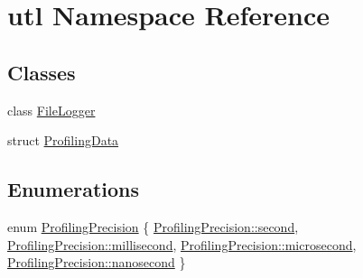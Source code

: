 \hypertarget{namespaceutl}{}\section{utl Namespace Reference}
\label{namespaceutl}
\subsection*{Classes}
\begin{DoxyCompactItemize}
\item 
class \mbox{\hyperlink{classutl_1_1_file_logger}{File\+Logger}}
\item 
struct \mbox{\hyperlink{structutl_1_1_profiling_data}{Profiling\+Data}}
\end{DoxyCompactItemize}
\subsection*{Enumerations}
\begin{DoxyCompactItemize}
\item 
enum \mbox{\hyperlink{namespaceutl_ad221bb3fac593651670bdc0263b92707}{Profiling\+Precision}} \{ \mbox{\hyperlink{namespaceutl_ad221bb3fac593651670bdc0263b92707aa9f0e61a137d86aa9db53465e0801612}{Profiling\+Precision\+::second}}, 
\mbox{\hyperlink{namespaceutl_ad221bb3fac593651670bdc0263b92707a407aa8403e413c457b081a9dc095a285}{Profiling\+Precision\+::millisecond}}, 
\mbox{\hyperlink{namespaceutl_ad221bb3fac593651670bdc0263b92707af4b6d59819445e05b152c708db4ede10}{Profiling\+Precision\+::microsecond}}, 
\mbox{\hyperlink{namespaceutl_ad221bb3fac593651670bdc0263b92707a0d7938bf86d4dc7a82f872433a9e1a1c}{Profiling\+Precision\+::nanosecond}}
 \}
\end{DoxyCompactItemize}
